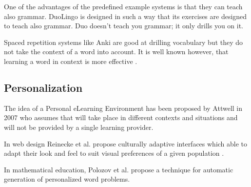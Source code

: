 One of the advantages of the predefined example systems is that they can teach also grammar. DuoLingo is designed in such a way that its exercises are designed to teach also grammar. Duo doesn't teach you grammar; it only drills you on it. 

Spaced repetition systems like Anki are good at drilling vocabulary but they do not take the context of a word into account. It is well known however, that learning a word in context is more effective \cite{nagy95-context}.

\subsection{Personalization}

The idea of a Personal eLearning Environment has been proposed by Attwell in 2007 \cite{Atwell07-personal} who assumes that will take place in different contexts and situations and will not be provided by a single learning provider.

In web design Reinecke et al. propose culturally adaptive interfaces which able to adapt their look and feel to suit visual preferences of a given population \cite{Reinecke13-CulturalAdaptation}. 

In mathematical education, Polozov et al. propose a technique for automatic generation of personalized word problems\cite{Polozov15-AdaptableMath}.









